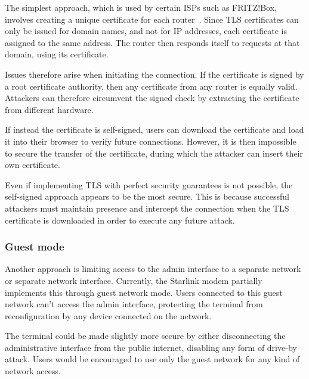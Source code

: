 The simplest approach, which is used by certain ISPs such as FRITZ!Box, involves creating a unique certificate for each router~\cite{fritzbox_cert}.
Since TLS certificates can only be issued for domain names, and not for IP addresses, each certificate is assigned to the same address.
The router then responds itself to requests at that domain, using its certificate.

Issues therefore arise when initiating the connection.
If the certificate is signed by a root certificate authority, then any certificate from any router is equally valid.
Attackers can therefore circumvent the signed check by extracting the certificate from different hardware.

If instead the certificate is self-signed, users can download the certificate and load it into their browser to verify future connections.
However, it is then impossible to secure the transfer of the certificate, during which the attacker can insert their own certificate.

Even if implementing TLS with perfect security guarantees is not possible, the self-signed approach appears to be the most secure.
This is because successful attackers must maintain presence and intercept the connection when the TLS certificate is downloaded in order to execute any future attack.

\subsubsection{Guest mode}

Another approach is limiting access to the admin interface to a separate network or separate network interface.
Currently, the Starlink modem partially implements this through guest network mode.
Users connected to this guest network can't access the admin interface, protecting the terminal from reconfiguration by any device connected on the network.

The terminal could be made slightly more secure by either disconnecting the administrative interface from the public internet, disabling any form of drive-by attack.
Users would be encouraged to use only the guest network for any kind of network access.

